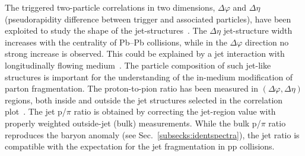 
The triggered two-particle correlations in two dimensions, $\Delta\varphi$ and $\Delta\eta$ (pseudorapidity difference between trigger and associated particles), have been exploited to study the shape of the jet-structures~\cite{Morsch:2012gb}. The $\Delta\eta$ jet-structure width increases with the centrality of Pb--Pb collisions, while in the $\Delta\varphi$ direction no strong increase is observed. This could be explained by a jet interaction with longitudinally flowing medium~\cite{Armesto:2004pt}. The particle composition of such jet-like structures is important for the understanding of the in-medium modification of parton fragmentation. The proton-to-pion ratio has been measured in $(\Delta\varphi, \Delta\eta)$ regions, both inside and outside the jet structures selected in the correlation plot~\cite{Veldhoen:2012ge}. The jet p/$\pi$ ratio is obtained by correcting the jet-region value with properly weighted outside-jet (bulk) measurements. While the bulk p/$\pi$ ratio reproduces the baryon anomaly (see Sec.~\ref{subsecks:identspectra}), the jet ratio is compatible with the expectation for the jet fragmentation in pp collisions.
